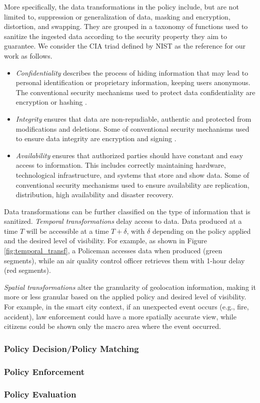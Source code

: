 More specifically, the data transformations in the policy include, but are not limited to, suppression or generalization of data, masking and encryption, distortion, and swapping. They are grouped in a taxonomy of functions used to sanitize the ingested data according to the security property they aim to guarantee. We consider the CIA triad defined by NIST \cite{nieles2017introduction} as the reference for our work as follows.

\begin{itemize}
  \item \textit{Confidentiality} describes the process of hiding information that may lead to personal identification or proprietary information, keeping users anonymous. The conventional security mechanisms used to protect data confidentiality are encryption or hashing \cite{ABE2:2006,IBE:2006,HOMOMEnc:2015}.
  \item \textit{Integrity} ensures that data are non-repudiable, authentic and protected from modifications and deletions. Some of conventional security mechanisms used to ensure data integrity are encryption and signing \cite{ABE2:2006}\cite{IBE:2006}\cite{HOMOMEnc:2015}.
  \item \textit{Availability} ensures that authorized parties should have constant and easy access to information. This includes correctly maintaining hardware, technological infrastructure, and systems that store and show data. Some of conventional security mechanisms used to ensure availability are replication, distribution, high availability and disaster recovery.
\end{itemize}

Data transformations can be further classified on the type of information that is sanitized. \textit{Temporal transformations} delay access to data. Data produced at a time $T$ will be accessible at a time $T+\delta$, with $\delta$ depending on the policy applied and the desired level of visibility. For example, as shown in Figure \ref{fig:temporal_transf}, a Policeman accesses data when produced (green segments), while an air quality control officer retrieves them with 1-hour delay (red segments).

\textit{Spatial transformations} alter the granularity of geolocation information, making it more or less granular based on the applied policy and desired level of visibility. For example, in the smart city context, if an unexpected event occurs (e.g., fire, accident), law enforcement could have a more spatially accurate view, while citizens could be shown only the macro area where the event occurred.
\subsubsection{Policy Decision/Policy Matching}
\subsubsection{Policy Enforcement}
\subsubsection{Policy Evaluation}